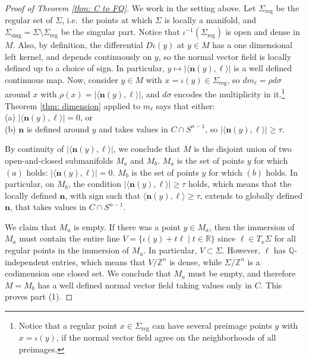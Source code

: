 \documentclass[11pt,letterpaper]{amsart}
\theoremstyle{definition}
\theoremstyle{plain}
\newcommand{\nfield}{\mathbf n}
\newcommand{\R}{{\mathbb R}}
\newcommand{\Q}{{\mathbb Q}}
\newcommand{\Z}{{\mathbb Z}}
\begin{document}
\begin{proof}[Proof of Theorem \ref{thm: C to FQ}]
We work in the setting above. 
Let $\Sigma_{\mathrm{reg}}$ be the regular set of $\Sigma$, i.e.~the points at which $\Sigma$ is locally a manifold, and $\Sigma_{\mathrm{sing}}=\Sigma\setminus\Sigma_{\mathrm{reg}}$ be the singular part. Notice that $\iota^{-1}(\Sigma_{\mathrm{reg}})$ is open and dense in $M$. 
Also, by definition, the differential $D\iota(y)$ at $y\in M$ has a one dimensional left kernel, and depends continuously on $y$, so the normal vector field is locally defined up to a choice of sign. In particular, $y\mapsto |\langle \nfield(y),\ell\rangle|$ is a well defined continuous map. Now, consider $y\in M$ with  $x=\iota(y)\in\Sigma_{\mathrm{reg}}$, so $dm_{\ell}=\rho d\sigma$ around $x$ with  $\rho(x)=|\langle\nfield(y),\ell\rangle|$, and $d\sigma$ encodes the multiplicity in it.\footnote{Notice that a regular point  $x\in\Sigma_{\mathrm{reg}}$ can have several preimage points $y$ with $x=\iota(y)$, if the normal vector field agree on the neighborhoods of all preimages.} 
Theorem \ref{thm: dimension} applied to $m_{\ell}$ says that either:\\
(a) $|\langle\nfield(y),\ell\rangle|=0$, or\\
(b) $\nfield$ is defined around $y$ and takes values in $C\cap S^{n-1}$, so $|\langle\nfield(y),\ell\rangle|\ge \tau$.

By continuity of $|\langle\nfield(y),\ell\rangle|$, we conclude that $M$ is the disjoint union of two open-and-closed submanifolds $M_a$ and $M_{b}$. $M_a$ is the set of points $y$ for which $(a)$ holds: $|\langle\nfield(y),\ell\rangle|=0$.  $M_b$ is the set of points $y$ for which $(b)$ holds. In particular, on $M_{b}$, the condition $|\langle\nfield(y),\ell\rangle|\ge \tau$ holds, which means that the locally defined $\nfield$, with sign such that $\langle\nfield(y),\ell\rangle\ge \tau$, extends to globally defined $\nfield$, that takes values in $C\cap S^{n-1}$. 

We claim that $M_a$ is empty. If there was a point $y\in M_a$, then the immersion of $M_a$ must contain the entire line $V=\{\iota(y)+t\ell\mid t\in\R\}$ since $\ell\in T_{x}\Sigma$ for all regular points in the immersion of $M_a$. In particular, $V\subset \Sigma$. However, $\ell$ has $\Q$-independent entries, which means that $V/\Z^n$ is dense, while $\Sigma/\Z^n$ is a codimension one closed set. We conclude that $M_a$ must be empty, and therefore $M=M_b$ has a well defined normal vector field taking values only in $C$. This proves part (1). 




\end{proof}
\end{document}
